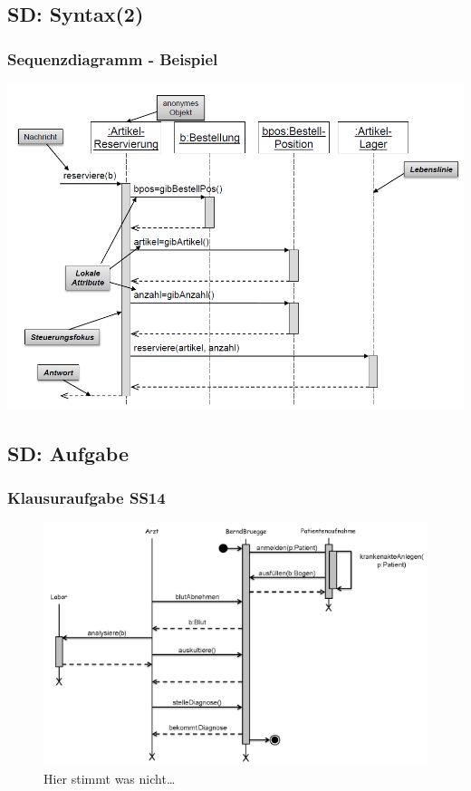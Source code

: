 \documentclass[18pt]{beamer}
\begin{document}
	\subsection{SD: Syntax(2)}
	\begin{frame}
		\frametitle{Sequenzdiagramm - Beispiel}
			\includegraphics[scale=0.4]{./pics/tut2/sd_ex.png}
	\end{frame}

	\subsection{SD: Aufgabe}
	\begin{frame}
		\frametitle{Klausuraufgabe SS14}
			\begin{figure}
				\centering
				\includegraphics[scale=0.65]{./pics/tut2/sdtask.png}
				\caption{Hier stimmt was nicht\dots}
			\end{figure}
	\end{frame}
\end{document}

